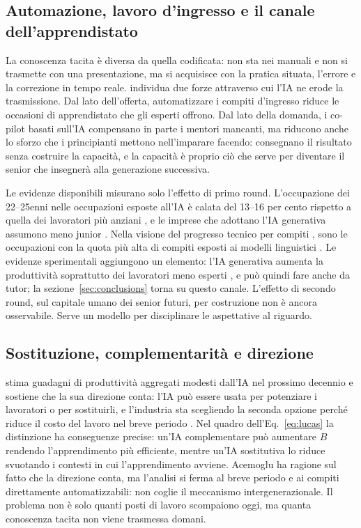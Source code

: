 \documentclass[preprint,12pt,authoryear]{elsarticle}
\begin{document}
\subsection{Automazione, lavoro d'ingresso e il canale dell'apprendistato}

La conoscenza tacita è diversa da quella codificata: non sta nei manuali e non si trasmette con una presentazione, ma si acquisisce con la pratica situata, l'errore e la correzione in tempo reale. \citet{Ide2026} individua due forze attraverso cui l'IA ne erode la trasmissione. Dal lato dell'offerta, automatizzare i compiti d'ingresso riduce le occasioni di apprendistato che gli esperti offrono. Dal lato della domanda, i co-pilot basati sull'IA compensano in parte i mentori mancanti, ma riducono anche lo sforzo che i principianti mettono nell'imparare facendo: consegnano il risultato senza costruire la capacità, e la capacità è proprio ciò che serve per diventare il senior che insegnerà alla generazione successiva.

Le evidenze disponibili misurano solo l'effetto di primo round. L'occupazione dei 22--25enni nelle occupazioni esposte all'IA è calata del 13--16 per cento rispetto a quella dei lavoratori più anziani \citep{Brynjolfsson2025}, e le imprese che adottano l'IA generativa assumono meno junior \citep{HosseiniLichtinger2025}. Nella visione del progresso tecnico per compiti \citep{AutorLevyMurnane2003,AcemogluAutor2011}, sono le occupazioni con la quota più alta di compiti esposti ai modelli linguistici \citep{Eloundou2024}. Le evidenze sperimentali aggiungono un elemento: l'IA generativa aumenta la produttività soprattutto dei lavoratori meno esperti \citep{NoyZhang2023,DellAcqua2023,BrynjolfssonLiRaymond2025}, e può quindi fare anche da tutor; la sezione~\ref{sec:conclusions} torna su questo canale. L'effetto di secondo round, sul capitale umano dei senior futuri, per costruzione non è ancora osservabile. Serve un modello per disciplinare le aspettative al riguardo.

\subsection{Sostituzione, complementarità e direzione}

\citet{Acemoglu2024} stima guadagni di produttività aggregati modesti dall'IA nel prossimo decennio e sostiene che la sua direzione conta: l'IA può essere usata per potenziare i lavoratori o per sostituirli, e l'industria sta scegliendo la seconda opzione perché riduce il costo del lavoro nel breve periodo \citep[si veda anche][]{AcemogluRestrepo2019}. Nel quadro dell'Eq.~\eqref{eq:lucas} la distinzione ha conseguenze precise: un'IA complementare può aumentare $B$ rendendo l'apprendimento più efficiente, mentre un'IA sostitutiva lo riduce svuotando i contesti in cui l'apprendimento avviene. Acemoglu ha ragione sul fatto che la direzione conta, ma l'analisi si ferma al breve periodo e ai compiti direttamente automatizzabili: non coglie il meccanismo intergenerazionale. Il problema non è solo quanti posti di lavoro scompaiono oggi, ma quanta conoscenza tacita non viene trasmessa domani.
\end{document}
